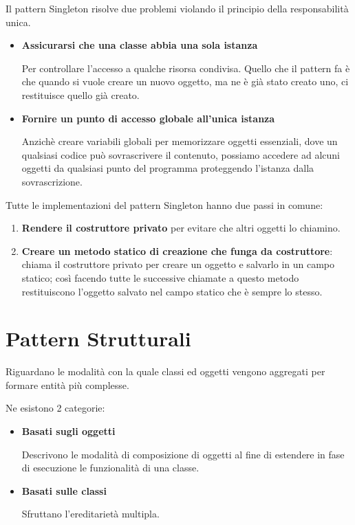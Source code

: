 \documentclass{report}
\begin{document}
\medskip
\noindent
Il pattern Singleton risolve due problemi violando il principio della responsabilità unica.
\begin{itemize}
    \item \textbf{Assicurarsi che una classe abbia una sola istanza}

    \noindent
    Per controllare l'accesso a qualche risorsa condivisa. Quello che il pattern fa è che quando si vuole creare un nuovo oggetto, ma ne è già stato creato uno, ci restituisce quello già creato.

    \item \textbf{Fornire un punto di accesso globale all'unica istanza}
    
    \noindent
    Anzichè creare variabili globali per memorizzare oggetti essenziali, dove un qualsiasi codice può sovrascrivere il contenuto, possiamo accedere ad alcuni oggetti da qualsiasi punto del programma proteggendo l'istanza dalla sovrascrizione.
\end{itemize}

\noindent
Tutte le implementazioni del pattern Singleton hanno due passi in comune:
\begin{enumerate}
    \item \textbf{Rendere il costruttore privato} per evitare che altri oggetti lo chiamino.
    \item \textbf{Creare un metodo statico di creazione che funga da costruttore}: chiama il costruttore privato per creare un oggetto e salvarlo in un campo statico; così facendo tutte le successive chiamate a questo metodo restituiscono l'oggetto salvato nel campo statico che è sempre lo stesso.
\end{enumerate}

\section{Pattern Strutturali}
Riguardano le modalità con la quale classi ed oggetti vengono aggregati per formare entità più complesse.

\noindent
Ne esistono 2 categorie:
\begin{itemize}
    \item \textbf{Basati sugli oggetti}

    \noindent
    Descrivono le modalità di composizione di oggetti al fine di estendere in fase di esecuzione le funzionalità di una classe.

    \item \textbf{Basati sulle classi}

    \noindent
    Sfruttano l'ereditarietà multipla.
\end{itemize}
\end{document}
